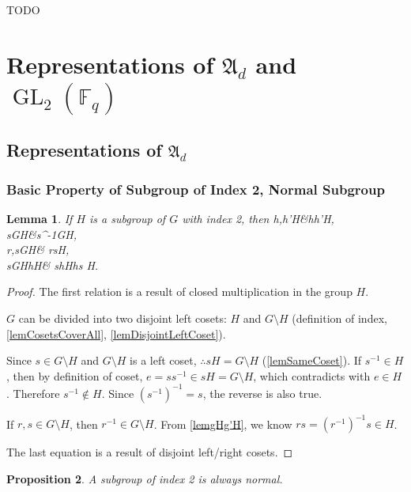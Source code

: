 \documentclass[12pt, letterpaper]{article}
\newcommand{\GL}{\operatorname{GL}}
\newcommand{\red}[1]{{\color{red} #1}}
\newenvironment{eqlong}{\equation\aligned}{\endaligned\endequation}
\newtheorem{prop}{Proposition}[section]
\newtheorem{lem}[prop]{Lemma}
\theoremstyle{definition}
\theoremstyle{remark}
\theoremstyle{definition}
\theoremstyle{plain}
\numberwithin{equation}{section}
\begin{document}
	\red{TODO}
	
	\section{Representations of $\mathfrak{A}_d$ and $\GL_2(\mathbb{F}_q)$}
	\subsection{Representations of $\mathfrak{A}_d$}
	
	\subsubsection{Basic Property of Subgroup of Index 2, Normal Subgroup}
	\begin{lem}\label{lemHalfGroupEvenOdd}
		If $H$ is a subgroup of $G$ with index 2, then 
		\begin{eqlong}
			h,h'\in H\implies&hh'\in H,\\
			s\in G\setminus H\iff &s^{-1}\in G\setminus H,\\
			r,s\in G\setminus H\implies& rs\in H,\\
			s\in G\setminus H\land h\in H\implies& sh\notin H\land hs \notin H.\\
		\end{eqlong}
	\end{lem}
	\begin{proof}
		The first relation is a result of closed multiplication in the group $H$.
		
		$G$ can be divided into two disjoint left cosets: $H$ and $G\setminus H$ (definition of index,
		\autoref{lemCosetsCoverAll}, \autoref{lemDisjointLeftCoset}).
		
		Since $s\in G\setminus H$ and $G\setminus H$ is a left coset,
		$\therefore sH=G\setminus H$ (\autoref{lemSameCoset}).
		If $s^{-1}\in H$, then by definition of coset, $e=ss^{-1}\in sH=G\setminus H$,
		which contradicts with $e\in H$.
		Therefore $s^{-1}\notin H$.
		Since $(s^{-1})^{-1}=s$, the reverse is also true.
		
		If $r,s\in G\setminus H$, then $r^{-1}\in G\setminus H$.
		From \autoref{lemgHg'H}, we know $rs=(r^{-1})^{-1}s\in H$.
		
		The last equation is a result of disjoint left/right cosets.
	\end{proof}
	\begin{prop}\label{lemHalfGroupNormal}
		A subgroup of index 2 is always normal.
	\end{prop}
\end{document}

